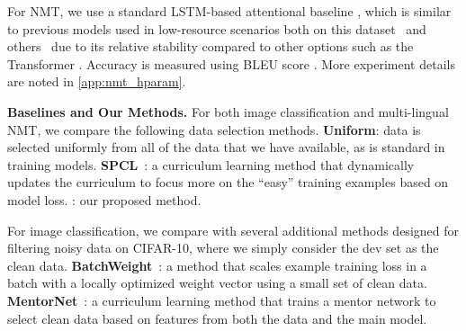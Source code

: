For NMT, we use a standard LSTM-based attentional baseline \citep{attention}, which is similar to previous models used in low-resource scenarios both on this dataset~\citep{rapid_adapt_nmt,sde} and others~\citep{lownmt19} due to its relative stability compared to other options such as the Transformer \citep{vaswani2017attention}. Accuracy is measured using BLEU score \citep{bleu}.
More experiment details are noted in \autoref{app:nmt_hparam}.

\noindent \textbf{Baselines and Our Methods.}
For both image classification and multi-lingual NMT, we compare the following data selection methods. \textbf{Uniform}: data is selected uniformly from all of the data that we have available, as is standard in training models. \textbf{SPCL}~\citep{spcl}: a curriculum learning method that dynamically updates the curriculum to focus more on the ``easy'' training examples based on model loss. \textbf{\dds}: our proposed method.

For image classification, we compare with several additional methods designed for filtering noisy data on CIFAR-10, where we simply consider the dev set as the clean data. \textbf{BatchWeight}~\citep{learn_reweight}: a method that scales example training loss in a batch with a locally optimized weight vector using a small set of clean data. \textbf{MentorNet}~\citep{mentornet}: a curriculum learning method that trains a mentor network to select clean data based on features from both the data and the main model.


